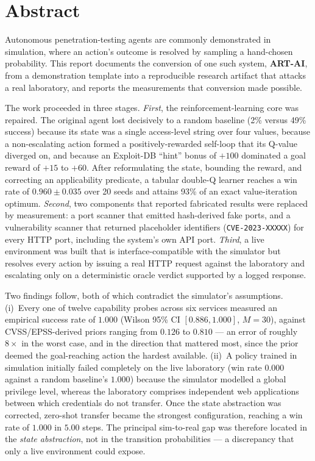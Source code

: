 \documentclass[11pt,a4paper]{report}
\newcommand{\code}[1]{\texttt{\small #1}}
\begin{document}
\chapter*{Abstract}

Autonomous penetration-testing agents are commonly demonstrated in simulation,
where an action's outcome is resolved by sampling a hand-chosen probability.
This report documents the conversion of one such system, \textbf{ART-AI}, from a
demonstration template into a reproducible research artifact that attacks a real
laboratory, and reports the measurements that conversion made possible.

The work proceeded in three stages. \emph{First}, the reinforcement-learning
core was repaired. The original agent lost decisively to a random baseline
(2\% versus 49\% success) because its state was a single access-level string
over four values, because a non-escalating action formed a positively-rewarded
self-loop that its Q-value diverged on, and because an Exploit-DB ``hint'' bonus
of $+100$ dominated a goal reward of $+15$ to $+60$. After reformulating the
state, bounding the reward, and correcting an applicability predicate, a tabular
double-Q learner reaches a win rate of $0.960 \pm 0.035$ over 20 seeds and
attains 93\% of an exact value-iteration optimum. \emph{Second}, two components
that reported fabricated results were replaced by measurement: a port scanner
that emitted hash-derived fake ports, and a vulnerability scanner that returned
placeholder identifiers (\code{CVE-2023-XXXXX}) for every HTTP port, including
the system's own API port. \emph{Third}, a live environment was built that is
interface-compatible with the simulator but resolves every action by issuing a
real HTTP request against the laboratory and escalating only on a deterministic
oracle verdict supported by a logged response.

Two findings follow, both of which contradict the simulator's assumptions.
(i)~Every one of twelve capability probes across six services measured an
empirical success rate of $1.000$ (Wilson 95\% CI $[0.886, 1.000]$, $M=30$),
against CVSS/EPSS-derived priors ranging from $0.126$ to $0.810$ --- an error of
roughly $8\times$ in the worst case, and in the direction that mattered most,
since the prior deemed the goal-reaching action the hardest available.
(ii)~A policy trained in simulation initially failed completely on the live
laboratory (win rate $0.000$ against a random baseline's $1.000$) because the
simulator modelled a global privilege level, whereas the laboratory comprises
independent web applications between which credentials do not transfer. Once the
state abstraction was corrected, zero-shot transfer became the strongest
configuration, reaching a win rate of $1.000$ in $5.00$ steps. The principal
sim-to-real gap was therefore located in the \emph{state abstraction}, not in
the transition probabilities --- a discrepancy that only a live environment
could expose.
\end{document}
